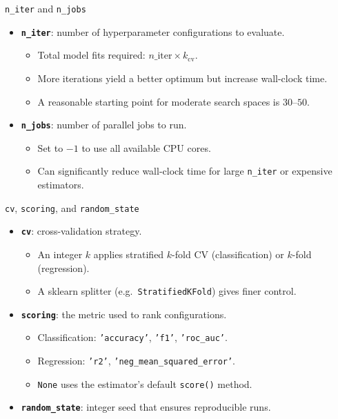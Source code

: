 \documentclass{beamer}
\begin{document}
\begin{frame}{\texttt{n\_iter} and \texttt{n\_jobs}}
  \begin{itemize}
    \item \textbf{\texttt{n\_iter}}: number of hyperparameter configurations to evaluate.
    \begin{itemize}
      \item Total model fits required: \(n\_\text{iter} \times k_\text{cv}.\)
      \item More iterations yield a better optimum but increase wall-clock time.
      \item A reasonable starting point for moderate search spaces is \(30\)--\(50.\)
    \end{itemize}
    \item \textbf{\texttt{n\_jobs}}: number of parallel jobs to run.
    \begin{itemize}
      \item Set to \(-1\) to use all available CPU cores.
      \item Can significantly reduce wall-clock time for large \texttt{n\_iter} or expensive estimators.
    \end{itemize}
  \end{itemize}
\end{frame}

\begin{frame}{\texttt{cv}, \texttt{scoring}, and \texttt{random\_state}}
  \begin{itemize}
    \item \textbf{\texttt{cv}}: cross-validation strategy.
    \begin{itemize}
      \item An integer \(k\) applies stratified \(k\)-fold CV (classification) or \(k\)-fold (regression).
      \item A sklearn splitter (e.g.\ \texttt{StratifiedKFold}) gives finer control.
    \end{itemize}
    \item \textbf{\texttt{scoring}}: the metric used to rank configurations.
    \begin{itemize}
      \item Classification: \texttt{'accuracy'}, \texttt{'f1'}, \texttt{'roc\_auc'}.
      \item Regression: \texttt{'r2'}, \texttt{'neg\_mean\_squared\_error'}.
      \item \texttt{None} uses the estimator's default \texttt{score()} method.
    \end{itemize}
    \item \textbf{\texttt{random\_state}}: integer seed that ensures reproducible runs.
  \end{itemize}
\end{frame}
\end{document}
